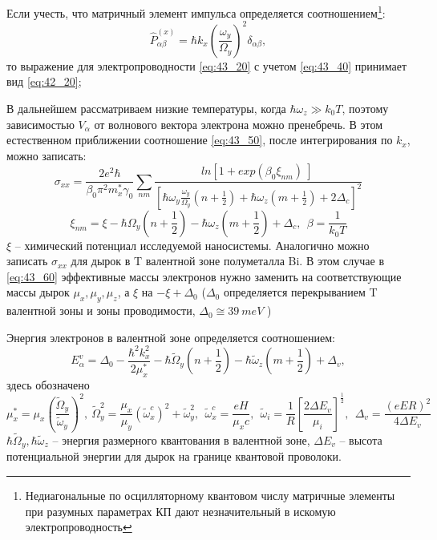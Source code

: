 Если учесть, что матричный элемент импульса определяется соотношением\footnote{Недиагональные по осцилляторному квантовом числу матричные элементы при разумных параметрах КП дают незначительный в искомую электропроводность}:
\[
{\hat{P}}^{\left(x\right)}_{\alpha \beta }=\hbar k_x{\left(\frac{{\omega }_y}{{\Omega }_y}\right)}^2{\delta }_{\alpha \beta },
\] 
то выражение для электропроводности \eqref{eq:43_20} с учетом \eqref{eq:43_40} принимает вид \eqref{eq:42_20};

В дальнейшем рассматриваем низкие температуры, когда $\hbar {\omega }_z\gg k_0T$, поэтому зависимостью $V_{\alpha }$ от волнового вектора электрона можно пренебречь. В этом естественном приближении соотношение \eqref{eq:43_50}, после интегрирования по $k_x$, можно записать:
\begin{equation} \label{eq:43_60}
{\sigma }_{xx}=\frac{2e^2\hbar }{{\beta }_0{\pi }^2m^*_x{\gamma }_0}\sum_{nm}{\frac{{ln \left[1+{exp \left({\beta }_0{\xi }_{nm}\right)\ }\right]\ }}{{\left[\hbar {\omega }_y\frac{{\omega }_y}{{\Omega }_y}\left(n+\frac{1}{2}\right)+\hbar {\omega }_z\left(m+\frac{1}{2}\right)+2{\Delta }_c\right]}^2}} 
\end{equation}
\[
{\xi }_{nm}=\xi -\hbar {\Omega }_y\left(n+\frac{1}{2}\right)-\hbar {\omega }_z\left(m+\frac{1}{2}\right)+{\Delta }_c,\ \ \beta =\frac{1}{k_0T}
\]
$\xi $ -- химический потенциал исследуемой наносистемы. Аналогично можно записать ${\sigma }_{xx}$ для дырок в T валентной зоне полуметалла Bi. В этом случае в \eqref{eq:43_60} эффективные массы электронов нужно заменить на соответствующие массы дырок ${\mu }_x,{\mu }_y,{\mu }_z$, а $\xi $  на $-\xi +{\Delta }_0$ (${\Delta }_0$ определяется перекрыванием T валентной зоны и зоны проводимости, ${\Delta }_0\cong 39\ meV$ \cite{Levin2009a}) 

Энергия электронов в валентной зоне определяется соотношением:
\[
E^v_{\alpha }={\Delta }_0-\frac{{\hbar }^2k^2_x}{2{\mu }^*_x}-\hbar {\widetilde{\Omega }}_y\left(n+\frac{1}{2}\right)-\hbar {\widetilde{\omega }}_z\left(m+\frac{1}{2}\right)+{\Delta }_v,
\] 
здесь обозначено
\[
{\mu }^*_x={\mu }_x{\left(\frac{{\widetilde{\Omega }}_y}{{\widetilde{\omega }}_y}\right)}^2,\ {\widetilde{\Omega }}^2_y=\frac{{\mu }_x}{{\mu }_y}{\left({\widetilde{\omega }}^c_x\right)}^2+{\widetilde{\omega }}^2_y,\ \ {\widetilde{\omega }}^c_x=\frac{eH}{{\mu }_xc},\ \ {\widetilde{\omega }}_i=\frac{1}{R}{\left[\frac{2\Delta E_v}{{\mu }_i}\right]}^{\frac{1}{2}},\ \ {\Delta }_v=\frac{{\left(eER\right)}^2}{4\Delta E_v}
\] 
$\hbar {\widetilde{\Omega }}_y, \hbar {\widetilde{\omega }}_z$ -- энергия размерного квантования в валентной зоне, $\Delta E_v$ -- высота потенциальной энергии для дырок на границе квантовой проволоки.

